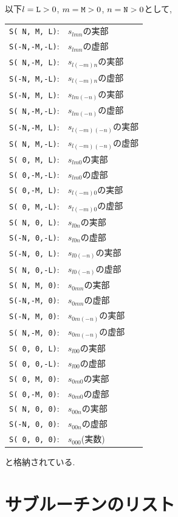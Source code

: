 \documentclass[a4j,fleqn]{jarticle}
\begin{document}
以下$l=\mbox{\tt L}>0$, $m=\mbox{\tt M}>0$,
$n=\mbox{\tt N}>0$として,
\begin{center}
\begin{tabular}{ll}
{\tt S( N, M, L)}:& $s_{lmn}$の実部\\
{\tt S(-N,-M,-L)}:& $s_{lmn}$の虚部\\
{\tt S( N,-M, L)}:& $s_{l(-m)n}$の実部\\
{\tt S(-N, M,-L)}:& $s_{l(-m)n}$の虚部\\
{\tt S(-N, M, L)}:& $s_{lm(-n)}$の実部\\
{\tt S( N,-M,-L)}:& $s_{lm(-n)}$の虚部\\
{\tt S(-N,-M, L)}:& $s_{l(-m)(-n)}$の実部\\
{\tt S( N, M,-L)}:& $s_{l(-m)(-n)}$の虚部\\
{\tt S( 0, M, L)}:& $s_{lm0}$の実部\\
{\tt S( 0,-M,-L)}:& $s_{lm0}$の虚部\\
{\tt S( 0,-M, L)}:& $s_{l(-m)0}$の実部\\
{\tt S( 0, M,-L)}:& $s_{l(-m)0}$の虚部\\
{\tt S( N, 0, L)}:& $s_{l0n}$の実部\\
{\tt S(-N, 0,-L)}:& $s_{l0n}$の虚部\\
{\tt S(-N, 0, L)}:& $s_{l0(-n)}$の実部\\
{\tt S( N, 0,-L)}:& $s_{l0(-n)}$の虚部\\
{\tt S( N, M, 0)}:& $s_{0mn}$の実部\\
{\tt S(-N,-M, 0)}:& $s_{0mn}$の虚部\\
{\tt S(-N, M, 0)}:& $s_{0m(-n)}$の実部\\
{\tt S( N,-M, 0)}:& $s_{0m(-n)}$の虚部\\
{\tt S( 0, 0, L)}:& $s_{l00}$の実部\\
{\tt S( 0, 0,-L)}:& $s_{l00}$の虚部\\
{\tt S( 0, M, 0)}:& $s_{0m0}$の実部\\
{\tt S( 0,-M, 0)}:& $s_{0m0}$の虚部\\
{\tt S( N, 0, 0)}:& $s_{00n}$の実部\\
{\tt S(-N, 0, 0)}:& $s_{00n}$の虚部\\
{\tt S( 0, 0, 0)}:& $s_{000}$(実数)
\end{tabular}
\end{center}
と格納されている.


\section{サブルーチンのリスト}
\end{document}
